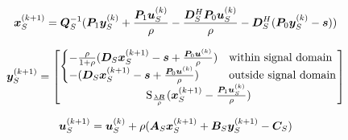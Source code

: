 \documentclass{article}
\begin{document}
\begin{equation}
\bm{x}_S^{(k + 1)} = \bm{Q}_S^{-1}(\bm{P}_1\bm{y}_S^{(k)} + \frac{\bm{P}_1\bm{u}_S^{(k)}}{\rho} - \frac{\bm{D}_S^H\bm{P}_0\bm{u}_S^{(k)}}{\rho} - \bm{D}_S^H(\bm{P}_0\bm{y}_S^{(k)} - \bm{s}))
\end{equation}

\begin{equation}
\bm{y}_S^{(k + 1)} = \begin{bmatrix}
\begin{cases}
-\frac{\rho}{1 + \rho}(\bm{D}_S\bm{x}_S^{(k + 1)} - \bm{s}  + \frac{\bm{P}_0\bm{u}^{(k)}}{\rho}) & \text{within signal domain}\\
-(\bm{D}_S\bm{x}_S^{(k + 1)} - \bm{s}  + \frac{\bm{P}_0\bm{u}^{(k)}}{\rho}) & \text{outside signal domain}
\end{cases} \\
\operatorname{S}_{\frac{\lambda\bm{R}}{\rho}}(\bm{x}_S^{(k+1)} - \frac{\bm{P}_1\bm{u}_S^{(k)}}{\rho})
\end{bmatrix}
\end{equation}


\begin{equation}
\bm{u}_S^{(k + 1)} = \bm{u}_S^{(k)} + \rho(\bm{A}_S\bm{x}_S^{(k + 1)} + \bm{B}_S\bm{y}_S^{(k + 1)} - \bm{C}_S)
\end{equation}
\end{document}
